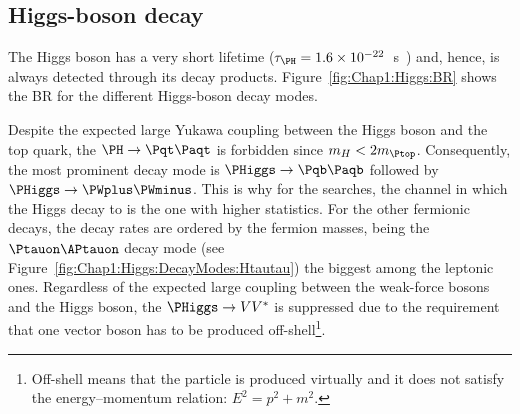 \subsection{Higgs-boson decay}
\label{sec:Chap1:Higgs_decay}

The Higgs boson has a very short lifetime ($\tau_{\PH} = 1.6 \times 10^{-22}$~s~\cite{LHCHiggsCrossSectionWorkingGroup:2016ypw}) and, hence,
is always detected through its decay products. 
Figure~\ref{fig:Chap1:Higgs:BR} shows the BR for the different Higgs-boson decay modes.

Despite the expected large Yukawa coupling between the 
Higgs boson and the top quark, the $\PH \rightarrow \ttbar$ is
forbidden since $\mH<2\mtop$. Consequently, the most 
prominent decay mode is $\PHiggs \rightarrow \bbbar$ followed by
$\PHiggs \rightarrow \PWplus \PWminus$. This is why for the \tHq searches, the 
channel in which the Higgs decay to \bbbar is the one with higher statistics. 
For the other fermionic decays, the decay rates are ordered by the fermion masses,
being the $\Ptauon\APtauon$ decay mode (see Figure~\ref{fig:Chap1:Higgs:DecayModes:Htautau}) 
the biggest among the leptonic ones. 
Regardless of the expected large coupling between the weak-force bosons and the Higgs boson, the $\PHiggs \rightarrow V V^{*}$ is
suppressed due to the requirement that one vector boson has to be produced off-shell\footnote{Off-shell means that the particle is produced virtually and it does not satisfy the energy--momentum relation: $E^2 = p^2 + m^2 $.}. 



